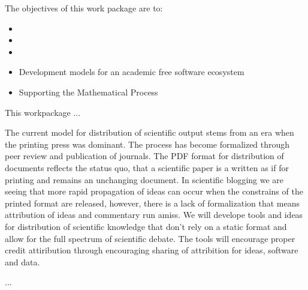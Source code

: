 \begin{workpackage}[id=social-aspects,wphases=12-24!.5,
  title=Social Aspects,
  UORM=1,USHRM=8]


\begin{wpobjectives}
The objectives of this work package are to:
\begin{itemize}
\item {}
\item
\item
\item Development models for an academic free software ecosystem
\item Supporting the Mathematical Process
\end{itemize}
\end{wpobjectives}

\begin{wpdescription}
This workpackage  ...
\end{wpdescription}

\begin{task}[title=Modern Distribution of Scientific Output]
  The current model for distribution of scientific output stems from an era when the printing press was dominant. The process has become formalized through peer review and publication of journals. The PDF format for distribution of documents reflects the status quo, that a scientific paper is a written as if for printing and remains an unchanging document. In scientific blogging we are seeing that more rapid propagation of ideas can occur when the constrains of the printed format are released, however, there is a lack of formalization that means attribution of ideas and commentary run amiss. We will develope tools and ideas for distribution of scientific knowledge that don't rely on a static format and allow for the full spectrum of scientific debate. The tools will encourage proper credit attiribution through encouraging sharing of attribition for ideas, software and data. 
\end{task}



\begin{wpdelivs}
  \begin{wpdeliv}[due=12,id=social_...,dissem=??,nature=??]
      {...}
\end{wpdeliv}
\end{wpdelivs}
\end{workpackage}

